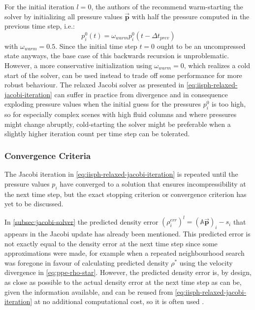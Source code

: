 \documentclass[oneside, a4paper]{book}
\newcommand\vek[1]{\vec{\bm{#1}}}
\newcommand\br[1]{\left(#1\right)}
\begin{document}
    For the initial iteration $l=0$, the authors of the \autocite[original paper]{iisph} recommend warm-starting the solver by initializing all pressure values $\vek{p}$ with half the pressure computed in the previous time step, i.e.:
    \begin{equation}
      p^0_i\br{t} = \omega_{warm}p^0_i\br{t-\Delta t_{prev}}
      \label{eq:iisph-warm-start}
    \end{equation}
    with $\omega_{warm}=0.5$. Since the initial time step $t=0$ ought to be an uncompressed state anyways, the base case of this backwards recursion is unproblematic. However, a more conservative initialization using $\omega_{warm}=0$, which realizes a cold start of the solver, can be used instead to trade off some performance for more robust behaviour. The relaxed Jacobi solver as presented in \autoref{eq:iisph-relaxed-jacobi-iteration} can suffer in practice from divergence and in consequence exploding pressure values when the initial guess for the pressures $p_i^0$ is too high, so for especially complex scenes with high fluid columns and where pressures might change abruptly, cold-starting the solver might be preferable when a slightly higher iteration count per time step can be tolerated.


  \subsubsection{Convergence Criteria}\label{subsec:iisph-convergence}
  The Jacobi iteration in \autoref{eq:iisph-relaxed-jacobi-iteration} is repeated until the pressure values $p_i$ have converged to a solution that ensures incompressibility at the next time step, but the exact stopping criterion or convergence criterion has yet to be discussed. 

  In \autoref{subsec:jacobi-solver} the predicted density error $\br{\rho^{err}_i}^l = \br{\mathds{A}\vek{p}}_i-s_i$ that appears in the Jacobi update has already been mentioned. This predicted error is not exactly equal to the density error at the next time step since some approximations were made, for example when a repeated neighbourhood search was foregone in favour of calculating predicted density $\rho^*$ using the velocity divergence in \autoref{eq:ppe-rho-star}. However, the predicted density error is, by design, as close as possible to the actual density error at the next time step as can be, given the information available, and can be reused from \autoref{eq:iisph-relaxed-jacobi-iteration} at no additional computational cost, so it is often used \autocites{tutorial2019}{iisph}. 
\end{document}
